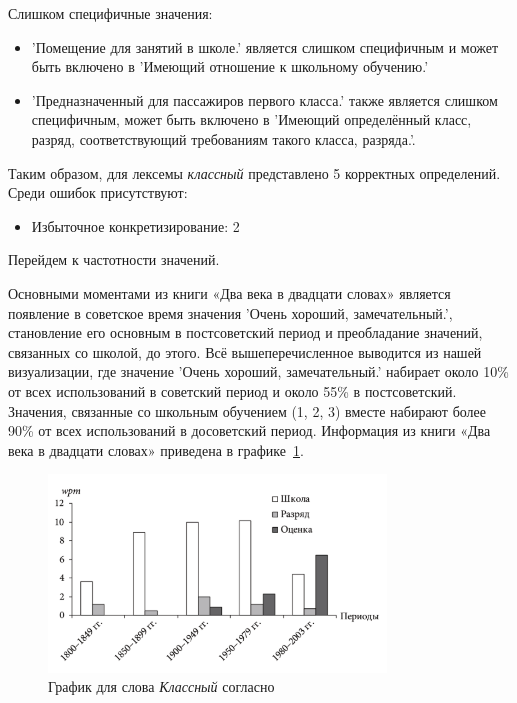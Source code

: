 Слишком специфичные значения:
\begin{itemize}
    \item ’Помещение для занятий в школе.’ является слишком специфичным
и может быть включено в ’Имеющий отношение к школьному обучению.’

    \item ’Предназначенный для пассажиров первого класса.’ также является слишком специфичным,
может быть включено в ’Имеющий определённый класс, разряд, соответствующий требованиям такого класса, разряда.’.
\end{itemize}

Таким образом, для лексемы \textit{классный} представлено 5 корректных определений.
Среди ошибок присутствуют:
\begin{itemize}
    \item Избыточное конкретизирование: 2
\end{itemize}

Перейдем к частотности значений.

Основными моментами из книги «Два века в двадцати словах» является появление
в советское время значения ’Очень хороший, замечательный.’,
становление его основным в постсоветский период и
преобладание значений, связанных со школой, до этого.
Всё вышеперечисленное выводится из нашей визуализации,
где значение ’Очень хороший, замечательный.’ набирает около 10\% от всех
использований в советский период и около 55\% в постсоветский.
Значения, связанные со школьным обучением (1, 2, 3) вместе набирают
более 90\% от всех использований в досоветский период.
Информация из книги «Два века в двадцати словах» приведена в графике~\ref{fig:TwoCenturiesKlassnij}.

\begin{figure}[H]
    \centering %
    \includegraphics[width=0.8\textwidth]{img/book/klassnij/all}
    \caption{График для слова \textit{Классный} согласно~\cite{TwoCenturies}}
    \label{fig:TwoCenturiesKlassnij}
\end{figure}

